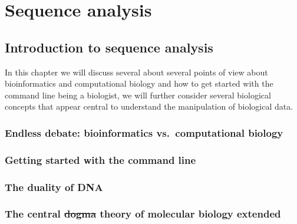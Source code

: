 \documentclass[
  letterpaper,
  DIV=11,
  numbers=noendperiod]{scrreprt}
\begin{document}
\part{Sequence analysis}

\hypertarget{introduction-to-sequence-analysis}{%
\chapter{Introduction to sequence
analysis}\label{introduction-to-sequence-analysis}}

In this chapter we will discuss several about several points of view
about bioinformatics and computational biology and how to get started
with the command line being a biologist, we will further consider
several biological concepts that appear central to understand the
manipulation of biological data.

\hypertarget{endless-debate-bioinformatics-vs.-computational-biology}{%
\section*{Endless debate: bioinformatics vs.~computational
biology}\label{endless-debate-bioinformatics-vs.-computational-biology}}

\hypertarget{getting-started-with-the-command-line}{%
\section*{Getting started with the command
line}\label{getting-started-with-the-command-line}}

\hypertarget{the-duality-of-dna}{%
\section*{The duality of DNA}\label{the-duality-of-dna}}

\hypertarget{the-central-dogma-theory-of-molecular-biology-extended}{%
\section*{\texorpdfstring{The central \sout{dogma} theory of molecular
biology
extended}{The central dogma theory of molecular biology extended}}\label{the-central-dogma-theory-of-molecular-biology-extended}}
\end{document}
